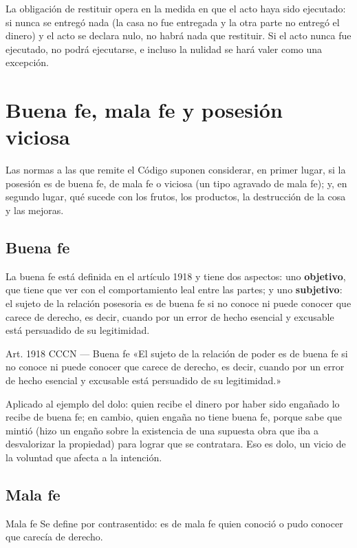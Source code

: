 \documentclass[12pt,oneside]{book}
\begin{document}
La obligación de restituir opera en la medida en que el acto haya sido ejecutado: si nunca se entregó nada (la casa no fue entregada y la otra parte no entregó el dinero) y el acto se declara nulo, no habrá nada que restituir. Si el acto nunca fue ejecutado, no podrá ejecutarse, e incluso la nulidad se hará valer como una excepción.

\section{Buena fe, mala fe y posesión viciosa}

Las normas a las que remite el Código suponen considerar, en primer lugar, si la posesión es de buena fe, de mala fe o viciosa (un tipo agravado de mala fe); y, en segundo lugar, qué sucede con los frutos, los productos, la destrucción de la cosa y las mejoras.

\subsection*{Buena fe}

La buena fe está definida en el artículo 1918 y tiene dos aspectos: uno \textbf{objetivo}, que tiene que ver con el comportamiento leal entre las partes; y uno \textbf{subjetivo}: el sujeto de la relación posesoria es de buena fe si no conoce ni puede conocer que carece de derecho, es decir, cuando por un error de hecho esencial y excusable está persuadido de su legitimidad.

\begin{articulo}{Art. 1918 CCCN --- Buena fe}
«El sujeto de la relación de poder es de buena fe si no conoce ni puede conocer que carece de derecho, es decir, cuando por un error de hecho esencial y excusable está persuadido de su legitimidad.»
\end{articulo}

Aplicado al ejemplo del dolo: quien recibe el dinero por haber sido engañado lo recibe de buena fe; en cambio, quien engaña no tiene buena fe, porque sabe que mintió (hizo un engaño sobre la existencia de una supuesta obra que iba a desvalorizar la propiedad) para lograr que se contratara. Eso es dolo, un vicio de la voluntad que afecta a la intención.

\subsection*{Mala fe}

\begin{definition}{Mala fe}
Se define por contrasentido: es de mala fe quien conoció o pudo conocer que carecía de derecho.
\end{definition}
\end{document}
